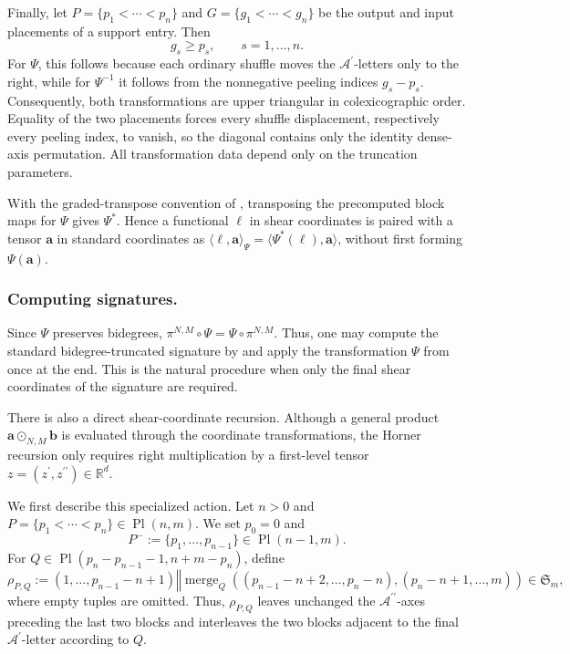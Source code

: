 \documentclass{amsart}
\theoremstyle{definition}
\theoremstyle{remark}
\begin{document}
Finally, let
$P=\{p_1<\cdots<p_n\}$ and
$G=\{g_1<\cdots<g_n\}$ be the output and input placements of a support
entry. Then
\[
    g_s\geq p_s,
    \qquad
    s=1,\ldots,n.
\]
For $\Psi$, this follows because each ordinary shuffle moves the
$\mathcal{A}^{\prime}$-letters only to the right, while for
$\Psi^{-1}$ it follows from the nonnegative peeling indices
$g_s-p_s$. Consequently, both transformations are upper triangular in
colexicographic order. Equality of the two placements forces every shuffle
displacement, respectively every peeling index, to vanish, so the diagonal
contains only the identity dense-axis permutation. All transformation data
depend only on the truncation parameters.

With the graded-transpose convention of \cite{mainpaper}, transposing the
precomputed block maps for $\Psi$ gives $\Psi^{\ast}$. Hence a functional
$\ell$ in shear coordinates is paired with a tensor $\mathbf{a}$ in standard
coordinates as
$\langle\ell,\mathbf{a}\rangle_{\Psi}
=\langle\Psi^{\ast}(\ell),\mathbf{a}\rangle$, without first forming
$\Psi(\mathbf{a})$.

\subsubsection{Computing signatures.}

Since $\Psi$ preserves bidegrees,
$\pi^{N,M}\circ\Psi=\Psi\circ\pi^{N,M}$. Thus, one may compute the
standard bidegree-truncated signature by
 and apply the transformation $\Psi$
from  once at the end. This is the natural
procedure when only the final shear coordinates of the signature are
required.

There is also a direct shear-coordinate recursion. Although a general
product $\mathbf{a}\odot_{N,M}\mathbf{b}$ is evaluated through the
coordinate transformations, the Horner recursion only requires right
multiplication by a first-level tensor
$z=(z^{\prime},z^{\prime\prime})\in\mathbb{R}^{d}$.

We first describe this specialized action. Let $n>0$ and
$P=\{p_1<\cdots<p_n\}\in\operatorname{Pl}(n,m)$. We set $p_0=0$ and
\[
    P^{-}
    :=
    \{p_1,\ldots,p_{n-1}\}
    \in
    \operatorname{Pl}(n-1,m).
\]
For
$Q\in
\operatorname{Pl}
\left(
    p_n-p_{n-1}-1,
    n+m-p_n
\right)$,
define
\[
    \rho_{P,Q}
    :=
    (1,\ldots,p_{n-1}-n+1)
    \mathbin{\Vert}
    \operatorname{merge}_{Q}
    \left(
        (p_{n-1}-n+2,\ldots,p_n-n),
        (p_n-n+1,\ldots,m)
    \right)
    \in
    \mathfrak{S}_m,
\]
where empty tuples are omitted. Thus, $\rho_{P,Q}$ leaves unchanged the
$\mathcal{A}^{\prime\prime}$-axes preceding the last two blocks and
interleaves the two blocks adjacent to the final
$\mathcal{A}^{\prime}$-letter according to $Q$.
\end{document}
